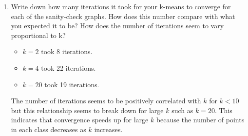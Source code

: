 \begin{enumerate}
    \item Write down how many iterations it took for your k-means to converge for each of the sanity-check graphs. How does this number compare with what you expected it to be? How does the number of iterations seem to vary proportional to k?
    \begin{itemize}
\item $k = 2$ took 8 iterations.
\item $k = 4$ took 22 iterations.
\item $k = 20$ took 19 iterations.
    \end{itemize}

        The number of iterations seems to be positively correlated with $k$ for $k < 10$ but this relationship seems to break down for large $k$ such as $k = 20$. This indicates that convergence speeds up for large $k$ because the number of points in each class decreases as $k$ increases.
\end{enumerate}
